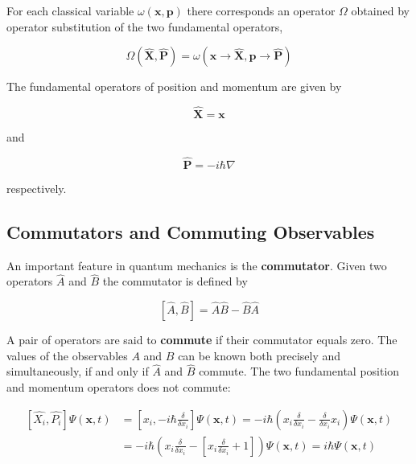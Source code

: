 For each classical variable
$\omega(\mathbf{x},\mathbf{p})$ there corresponds an operator $\Omega$
obtained by operator substitution of the two fundamental operators,

\begin{equation}
  \Omega(\mathbf{\hat{X}},\mathbf{\hat{P}}) = \omega(\mathbf{x} \to
  \mathbf{\hat{X}},\mathbf{p} \to \mathbf{\hat{P}})
  \label{operatorSubstitution}
\end{equation}

The fundamental operators of position and momentum are given by

\begin{equation*}
  \mathbf{\hat{X}} = \mathbf{x}
\end{equation*}

and

\begin{equation*}
  \mathbf{\hat{P}} = -i\hbar \nabla
\end{equation*}

respectively. 



\subsection{Commutators and Commuting Observables}

An important feature in quantum mechanics is the 
{\bf commutator}. Given two operators $\hat{A}$ and $\hat{B}$ the
commutator is defined by

\begin{equation*}
  \left[ \hat{A}, \hat{B} \right] = \hat{A} \hat{B} - \hat{B} \hat{A}
\end{equation*}

A pair of operators are said to {\bf commute} if their commutator
equals zero. The values of the observables $A$ and $B$ can be known
both precisely and simultaneously, if and only if $\hat{A}$ and
$\hat{B}$ commute. The two fundamental position and momentum operators
does not commute:

\begin{equation*}
  \begin{split} 
  \left[ \hat{X_i}, \hat{P_i} \right] \Psi(\mathbf{x}, t) 
  &= \left[ x_i, -i \hbar \frac{\delta}{\delta x_i} \right] \Psi(\mathbf{x},t)
  = -i \hbar \left( x_i \frac{\delta}{\delta x_i} -
  \frac{\delta}{\delta x_i} x_i \right) \Psi(\mathbf{x},t) \\
  &= -i \hbar \left( x_i \frac{\delta}{\delta x_i} - \left[ x_i
  \frac{\delta}{\delta x_i} + 1 \right] \right) \Psi(\mathbf{x},t) 
  = i \hbar \Psi(\mathbf{x},t)
  \end{split}
\end{equation*}

